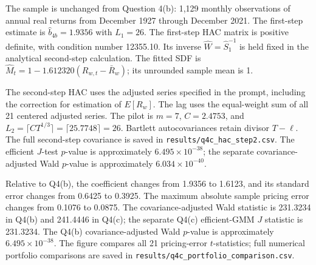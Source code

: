 The sample is unchanged from Question 4(b): 1,129 monthly observations of annual real returns
from December 1927 through December 2021.
The first-step estimate is $\hat b_{4b}=1.9356$ with $L_1=26$.
The first-step HAC matrix is positive definite, with condition number 12355.10.
Its inverse $\hat W=\hat S_1^{-1}$ is held fixed in the analytical second-step calculation.
The fitted SDF is $\hat M_t=1-1.612320(R_{w,t}-\bar R_w)$; its unrounded sample mean is 1.

The second-step HAC uses the adjusted series specified in the prompt, including the
correction for estimation of $E[R_w]$. The lag uses the equal-weight sum of all 21 centered adjusted series.
The pilot is $m=7$, $C=2.4753$, and
$L_2=\lceil CT^{1/3}\rceil=\lceil 25.7748\rceil=26$.
Bartlett autocovariances retain divisor $T-\ell$.
The full second-step covariance is saved in \texttt{results/q4c\_hac\_step2.csv}.
The efficient $J$-test $p$-value is approximately $6.495\times10^{-38}$;
the separate covariance-adjusted Wald $p$-value is approximately $6.034\times10^{-40}$.

Relative to Q4(b), the coefficient changes from 1.9356 to 1.6123,
and its standard error changes from 0.6425 to 0.3925.
The maximum absolute sample pricing error changes from 0.1076
to 0.0875.
The covariance-adjusted Wald statistic is 231.3234 in Q4(b) and 241.4446 in Q4(c);
the separate Q4(c) efficient-GMM $J$ statistic is 231.3234.
The Q4(b) covariance-adjusted Wald $p$-value is approximately $6.495\times10^{-38}$.
The figure compares all 21 pricing-error $t$-statistics; full numerical portfolio comparisons
are saved in \texttt{results/q4c\_portfolio\_comparison.csv}.
